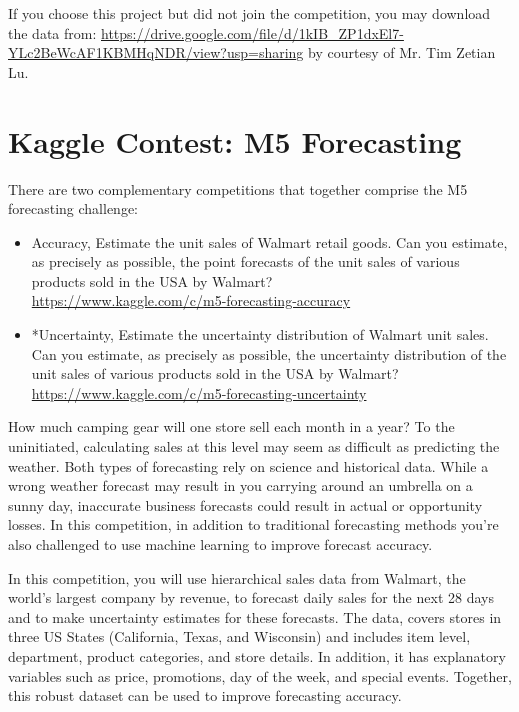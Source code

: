 \documentclass[11pt]{article}
\begin{document}
If you choose this project but did not join the competition, you may download the data from: \url{https://drive.google.com/file/d/1kIB_ZP1dxEl7-YLc2BeWcAF1KBMHqNDR/view?usp=sharing} by courtesy of Mr. Tim Zetian Lu.




\section{Kaggle Contest: M5 Forecasting}

There are two complementary competitions that together comprise the M5 forecasting challenge: 
\begin{itemize}
\item Accuracy, Estimate the unit sales of Walmart retail goods. Can you estimate, as precisely as possible, the point forecasts of the unit sales of various products sold in the USA by Walmart? \\
\url{https://www.kaggle.com/c/m5-forecasting-accuracy}
\item *Uncertainty, Estimate the uncertainty distribution of Walmart unit sales.  Can you estimate, as precisely as possible, the uncertainty distribution of the unit sales of various products sold in the USA by Walmart? \\
\url{https://www.kaggle.com/c/m5-forecasting-uncertainty}
\end{itemize}

How much camping gear will one store sell each month in a year? To the uninitiated, calculating sales at this level may seem as difficult as predicting the weather. Both types of forecasting rely on science and historical data. While a wrong weather forecast may result in you carrying around an umbrella on a sunny day, inaccurate business forecasts could result in actual or opportunity losses. In this competition, in addition to traditional forecasting methods you're also challenged to use machine learning to improve forecast accuracy.

In this competition, you will use hierarchical sales data from Walmart, the world's largest company by revenue, to forecast daily sales for the next 28 days and to make uncertainty estimates for these forecasts. The data, covers stores in three US States (California, Texas, and Wisconsin) and includes item level, department, product categories, and store details. In addition, it has explanatory variables such as price, promotions, day of the week, and special events. Together, this robust dataset can be used to improve forecasting accuracy. 
\end{document}
